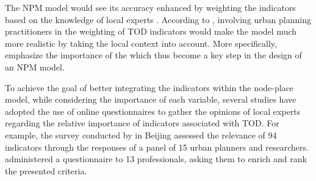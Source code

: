 \begin{refsegment}
The \acrshort{NPM} model would see its accuracy enhanced by weighting the indicators based on the knowledge of local experts \textcolor{blue}{\autocites[274]{li_transit_2019}[9]{liao_evaluating_2022}}. According to \textcolor{blue}{\textcite[3]{lukman_development_2014}}, involving urban planning practitioners in the weighting of \acrshort{TOD} indicators would make the model much more realistic by taking the local context into account. More specifically, \textcolor{blue}{\textcite[10]{lukman_development_2014}} emphasize the importance of the  which thus become a key step in the design of an \acrshort{NPM} model.%

To achieve the goal of better integrating the indicators within the node-place model, while considering the importance of each variable, several studies have adopted the use of online questionnaires to gather the opinions of local experts regarding the relative importance of indicators associated with \acrshort{TOD}. For example, the survey conducted by \textcolor{blue}{\textcite[42]{lyu_developing_2016}} in Beijing assessed the relevance of 94 indicators through the responses of a panel of 15 urban planners and researchers. \textcolor{blue}{\textcite[196]{reusser_classifying_2008}} administered a questionnaire to 13 professionals, asking them to enrich and rank the presented criteria.%


\end{refsegment}
